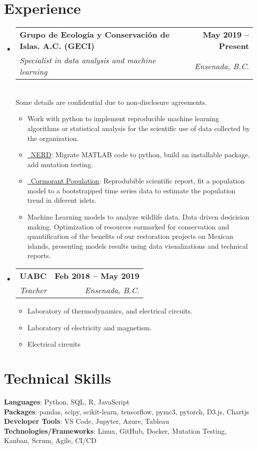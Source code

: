 \documentclass[letterpaper,11pt]{article}
\makeatletter
\newcommand{\resumeItem}[1]{
  \item\small{
    {#1 \vspace{-2pt}}
  }
}
\newcommand{\resumeSubheading}[4]{
  \vspace{-2pt}\item
    \begin{tabular*}{1.0\textwidth}[t]{l@{\extracolsep{\fill}}r}
      \textbf{#1} & \textbf{\small #2} \\
      \textit{\small#3} & \textit{\small #4} \\
    \end{tabular*}\vspace{-7pt}
}
\newcommand{\resumeSubHeadingListStart}{\begin{itemize}[leftmargin=0.0in, label={}]}
\newcommand{\resumeSubHeadingListEnd}{\end{itemize}}
\newcommand{\resumeItemListStart}{\begin{itemize}}
\newcommand{\resumeItemListEnd}{\end{itemize}\vspace{-5pt}}
\makeatother
\begin{document}
\section{Experience}
  \resumeSubHeadingListStart

    \resumeSubheading
      {Grupo de Ecología y Conservación de Islas. A.C. (GECI)}{May 2019 -- Present}
      {Specialist in data analysis and machine learning}{Ensenada, B.C.}\\ \vspace{7pt}
      \small Some details are confidential due to non-disclosure agreements.
      \resumeItemListStart
        \resumeItem{Work with python to implement reproducible machine learning algorithms or statistical analysis for the scientific use of data collected by the organization.}
        \resumeItem{\href{https://github.com/IslasGECI/nerd}{\raisebox{-0.2\height}\faGithub\ \underline{NERD}}: Migrate MATLAB code to python, build an installable package, add mutation testing.}
        \resumeItem{\href{https://github.com/IslasGECI/cormorant_population_growth}{\raisebox{-0.2\height}\faGithub\ \underline{Cormorant Population}}: Reprodubible scientific report, fit a population model to a bootstrapped time series data to estimate the population trend in diferent islets.}
        \resumeItem{Machine Learning models to analyze wildlife data. Data driven desicision making. Optimization of resources earmarked for conservation and quantification of the benefits of our restoration projects on Mexican islands, presenting models results using data visualizations and technical reports.}

      \resumeItemListEnd

    \resumeSubheading
      {UABC}{Feb 2018 -- May 2019}
      {Teacher}{Ensenada, B.C.} \vspace{3pt}
      \resumeItemListStart Courses:
        \resumeItem{Laboratory of thermodynamics,  and electrical circuits.}
        \resumeItem{Laboratory of electricity and magnetism.}
        \resumeItem{Electrical circuits}
    \resumeItemListEnd
    
  \resumeSubHeadingListEnd
\vspace{-16pt}

\section{Technical Skills}
 \begin{itemize}[leftmargin=0.15in, label={}]
    \small{\item{
     \textbf{Languages}{: Python, SQL, R, JavaScript} \\
     \textbf{Packages}{: pandas, scipy, scikit-learn, tensorflow, pymc3, pytorch, D3.js, Chartjs} \\
     \textbf{Developer Tools}{: VS Code, Jupyter, Azure, Tableau} \\
     \textbf{Technologies/Frameworks}{: Linux, GitHub, Docker, Mutation Testing, Kanban, Scrum, Agile, CI/CD} \\
    }}
 \end{itemize}
 \vspace{-16pt}
\end{document}
